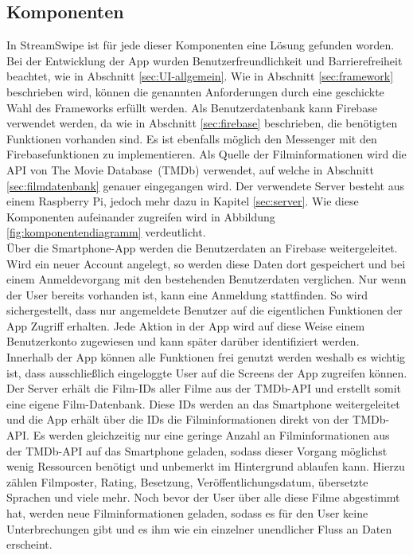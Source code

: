\subsection{Komponenten}
\label{sec:komponenten}
In StreamSwipe ist für jede dieser Komponenten eine Lösung gefunden worden. 
Bei der Entwicklung der App wurden Benutzerfreundlichkeit und Barrierefreiheit beachtet, wie in Abschnitt \ref{sec:UI-allgemein}. Wie in Abschnitt \ref{sec:framework} beschrieben wird, können die genannten Anforderungen durch eine geschickte Wahl des Frameworks erfüllt werden. Als Benutzerdatenbank kann Firebase verwendet werden, da wie in Abschnitt \ref{sec:firebase} beschrieben, die benötigten Funktionen vorhanden sind. Es ist ebenfalls möglich den Messenger mit den Firebasefunktionen zu implementieren. Als Quelle der Filminformationen wird die API von \glqq The Movie Database\grqq \, (TMDb) verwendet, auf welche in Abschnitt \ref{sec:filmdatenbank} genauer eingegangen wird. Der verwendete Server besteht aus einem Raspberry Pi, jedoch mehr dazu in Kapitel \ref{sec:server}. Wie diese Komponenten aufeinander zugreifen wird in Abbildung \ref{fig:komponentendiagramm} verdeutlicht.\\
Über die Smartphone-App werden die Benutzerdaten an Firebase weitergeleitet. Wird ein neuer Account angelegt, so werden diese Daten dort gespeichert und bei einem Anmeldevorgang mit den bestehenden Benutzerdaten verglichen. Nur wenn der User bereits vorhanden ist, kann eine Anmeldung stattfinden. So wird sichergestellt, dass nur angemeldete Benutzer auf die eigentlichen Funktionen der App Zugriff erhalten. Jede Aktion in der App wird auf diese Weise einem Benutzerkonto zugewiesen und kann später darüber identifiziert werden. Innerhalb der App können alle Funktionen frei genutzt werden weshalb es wichtig ist, dass ausschließlich eingeloggte User auf die Screens der App zugreifen können.\\
Der Server erhält die Film-IDs aller Filme aus der TMDb-API  und erstellt somit eine eigene Film-Datenbank. Diese IDs werden an das Smartphone weitergeleitet und die App erhält über die IDs die Filminformationen direkt von der TMDb-API. Es werden gleichzeitig nur eine geringe Anzahl an Filminformationen aus der TMDb-API auf das Smartphone geladen, sodass dieser Vorgang möglichst wenig Ressourcen benötigt und unbemerkt im Hintergrund ablaufen kann. Hierzu zählen Filmposter, Rating, Besetzung, Veröffentlichungsdatum, übersetzte Sprachen und viele mehr. Noch bevor der User über alle diese Filme abgestimmt hat, werden neue Filminformationen geladen, sodass es für den User keine Unterbrechungen gibt und es ihm wie ein einzelner unendlicher Fluss an Daten erscheint. \\
